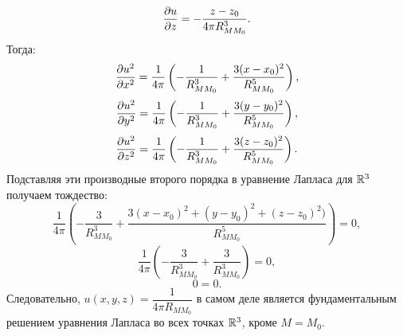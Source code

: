 \documentclass[../main.tex]{subfiles}
\begin{document}
\begin{enumerate}
\[            \frac{\partial u}{\partial z} = - \dfrac{z-z_0}{4\pi R_{MM_0}^3}.
        \]
        Тогда:
        \[
            \pderivTwo{u}{x}{x} = \dfrac{1}{4\pi} \left(-\dfrac{1}{R_{MM_0}^3} + \dfrac{3(x-x_0)^2}{R_{MM_0}^5}\right),
        \]
        \[
            \pderivTwo{u}{y}{y} = \dfrac{1}{4\pi} \left(-\dfrac{1}{R_{MM_0}^3} + \dfrac{3(y-y_0)^2}{R_{MM_0}^5}\right),
        \]
        \[
            \pderivTwo{u}{z}{z} = \dfrac{1}{4\pi} \left(-\dfrac{1}{R_{MM_0}^3} + \dfrac{3(z-z_0)^2}{R_{MM_0}^5}\right).
        \]
        Подставляя эти производные второго порядка в уравнение Лапласа для $\mathbb{R}^3$ получаем тождество:
        \[
            \dfrac{1}{4\pi}\left(-\dfrac{3}{R_{MM_0}^3} + \dfrac{3(x-x_0)^2 + (y-y_0)^2 + (z-z_0)^2)}{R_{MM_0}^5}\right) = 0,
        \]
        \[
            \dfrac{1}{4\pi}\left(-\dfrac{3}{R_{MM_0}^3} + \dfrac{3}{R_{MM_0}^3}\right) = 0,
        \]
        \[
            0 = 0.
        \]
        Следовательно, $u(x, y, z) = \dfrac{1}{4\pi R_{MM_0}}$ в самом деле является фундаментальным решением уравнения Лапласа во всех точках $\mathbb{R}^3$, кроме $M = M_0$.
    \end{enumerate}
\end{document}
